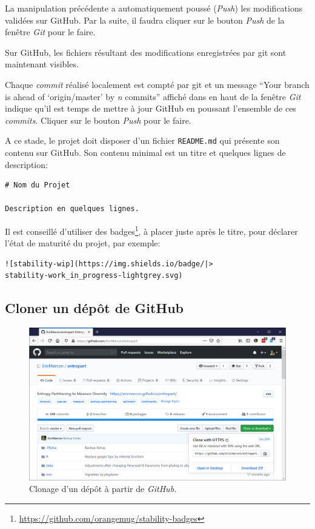 \documentclass[
  12pt,
  french,
  a4paper,
  extrafontsizes,onecolumn,openright
  ]{memoir}
\begin{document}
La manipulation précédente a automatiquement poussé (\emph{Push}) les modifications validées sur GitHub.
Par la suite, il faudra cliquer sur le bouton \emph{Push} de la fenêtre \emph{Git} pour le faire.

Sur GitHub, les fichiers résultant des modifications enregistrées par git sont maintenant visibles.

Chaque \emph{commit} réalisé localement est compté par git et un message \enquote{Your branch is ahead of \enquote{origin/master} by \emph{n} commits} affiché dans en haut de la fenêtre \emph{Git} indique qu'il est temps de mettre à jour GitHub en poussant l'ensemble de ces \emph{commits}.
Cliquer sur le bouton \emph{Push} pour le faire.

A ce stade, le projet doit disposer d'un fichier \texttt{README.md} qui présente son contenu sur GitHub.
Son contenu minimal est un titre et quelques lignes de description:

\begin{verbatim}
# Nom du Projet

Description en quelques lignes.
\end{verbatim}

Il est conseillé d'utiliser des badges\footnote{\url{https://github.com/orangemug/stability-badges}}, à placer juste après le titre, pour déclarer l'état de maturité du projet, par exemple:

\begin{verbatim}
![stability-wip](https://img.shields.io/badge/|>
stability-work_in_progress-lightgrey.svg)
\end{verbatim}

\hypertarget{cloner-un-duxe9puxf4t-de-github}{%
\subsection{Cloner un dépôt de GitHub}\label{cloner-un-duxe9puxf4t-de-github}}



\scriptsize

\begin{figure}

{\centering \includegraphics[width=0.8\linewidth]{images/git-Clone} 

}

\caption{Clonage d'un dépôt à partir de \emph{GitHub.}}\label{fig:git-Clone}
\end{figure}
\end{document}
